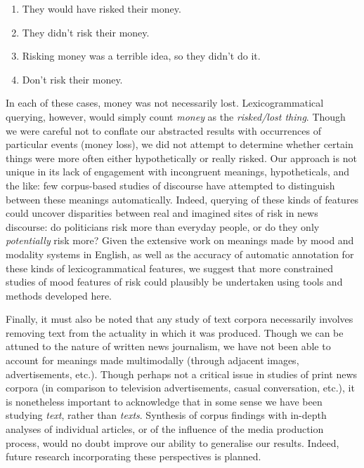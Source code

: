 \begin{enumerate} [before=\color{black}\ttfamily] \setlength\itemsep{0em} \small \setlength\itemsep{0em} \small
\item They would have risked their money.
\item They didn't risk their money.
\item Risking money was a terrible idea, so they didn't do it.
\item Don't risk their money.
\end{enumerate}
%
In each of these cases, money was not necessarily lost. Lexicogrammatical querying, however, would simply count \emph{money} as the \emph{risked\slash lost thing}. Though we were careful not to conflate our abstracted results with occurrences of particular events (money loss), we did not attempt to determine whether certain things were more often either hypothetically or really risked. Our approach is not unique in its lack of engagement with incongruent meanings, hypotheticals, and the like: few corpus-based studies of discourse have attempted to distinguish between these meanings automatically. Indeed, querying of these kinds of features could uncover disparities between real and imagined sites of risk in news discourse: do politicians risk more than everyday people, or do they only \emph{potentially} risk more? Given the extensive work on meanings made by mood and modality systems in English, as well as the accuracy of automatic annotation for these kinds of lexicogrammatical features, we suggest that more constrained studies of mood features of risk could plausibly be undertaken using tools and methods developed here.

Finally, it must also be noted that any study of text corpora necessarily involves removing text from the actuality in which it was produced. Though we can be attuned to the nature of written news journalism, we have not been able to account for meanings made multimodally (through adjacent images, advertisements, etc.). Though perhaps not a critical issue in studies of print news corpora (in comparison to television advertisements, casual conversation, etc.), it is nonetheless important to acknowledge that in some sense we have been studying \emph{text}, rather than \emph{texts}. Synthesis of corpus findings with in-depth analyses of individual articles, or of the influence of the media production process, would no doubt improve our ability to generalise our results. Indeed, future research incorporating these perspectives is planned.

